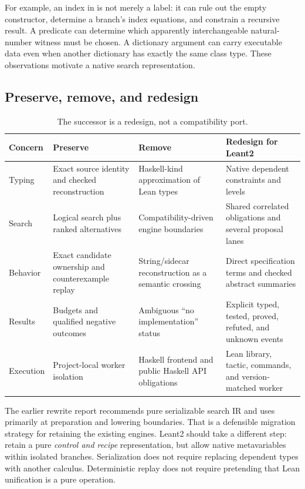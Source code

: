 For example, an index in  is not merely a label: it can rule out the empty constructor, determine a branch's index equations, and constrain a recursive result. A  predicate can determine which apparently interchangeable natural-number witness must be chosen. A dictionary argument can carry executable data even when another dictionary has exactly the same class type. These observations motivate a native search representation.

\subsection{Preserve, remove, and redesign}
\begin{table}[ht]
\centering\small
\begin{tabularx}{\textwidth}{@{}L{0.19\textwidth}YYY@{}}
\toprule
Concern & Preserve & Remove & Redesign for Leant2 \\
\midrule
Typing & Exact source identity and checked reconstruction & Haskell-kind approximation of Lean types & Native dependent constraints and levels \\
Search & Logical search plus ranked alternatives & Compatibility-driven engine boundaries & Shared correlated obligations and several proposal lanes \\
Behavior & Exact candidate ownership and counterexample replay & String/sidecar reconstruction as a semantic crossing & Direct specification terms and checked abstract summaries \\
Results & Budgets and qualified negative outcomes & Ambiguous ``no implementation'' status & Explicit typed, tested, proved, refuted, and unknown events \\
Execution & Project-local worker isolation & Haskell frontend and public Haskell API obligations & Lean library, tactic, commands, and version-matched worker \\
\bottomrule
\end{tabularx}
\caption{The successor is a redesign, not a compatibility port.}
\end{table}

The earlier rewrite report recommends pure serializable search IR and uses \MetaM{} primarily at preparation and lowering boundaries. That is a defensible migration strategy for retaining the existing engines. Leant2 should take a different step: retain a pure \emph{control and recipe} representation, but allow native metavariables within isolated branches. Serialization does not require replacing dependent types with another calculus. Deterministic replay does not require pretending that Lean unification is a pure operation.\cite{rewrite}

